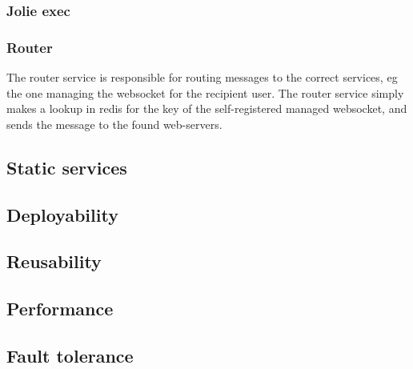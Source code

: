 \subsubsection{Jolie exec}
\subsubsection{Router}
The router service is responsible for routing messages to the correct services, eg the one managing the websocket for the recipient user.
The router service simply makes a lookup in redis for the key of the self-registered managed websocket, and sends the message to the found web-servers.
\subsection{Static services}
\subsection{Deployability}
\subsection{Reusability}
\subsection{Performance}
\subsection{Fault tolerance}